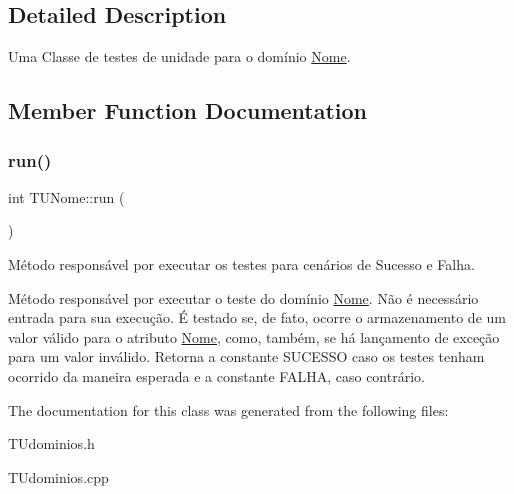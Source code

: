 \subsection{Detailed Description}
Uma Classe de testes de unidade para o domínio \hyperlink{classNome}{Nome}. 

\subsection{Member Function Documentation}
\mbox{\label{classTUNome_ae20734cb15f71890e57aff02a00f6313}} 
\subsubsection{\texorpdfstring{run()}{run()}}
{\footnotesize\ttfamily int T\+U\+Nome\+::run (\begin{DoxyParamCaption}{ }\end{DoxyParamCaption})}



Método responsável por executar os testes para cenários de Sucesso e Falha. 

Método responsável por executar o teste do domínio \hyperlink{classNome}{Nome}. Não é necessário entrada para sua execução. É testado se, de fato, ocorre o armazenamento de um valor válido para o atributo \hyperlink{classNome}{Nome}, como, também, se há lançamento de exceção para um valor inválido. Retorna a constante S\+U\+C\+E\+S\+SO caso os testes tenham ocorrido da maneira esperada e a constante F\+A\+L\+HA, caso contrário. 

The documentation for this class was generated from the following files\+:\begin{DoxyCompactItemize}
\item 
T\+Udominios.\+h\item 
T\+Udominios.\+cpp\end{DoxyCompactItemize}

